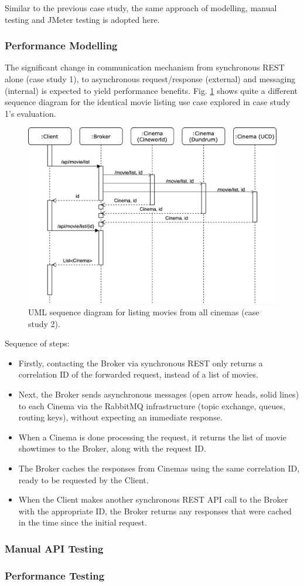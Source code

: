 Similar to the previous case study, the same approach of modelling, manual testing and JMeter testing is adopted here.

\subsubsection{Performance Modelling}

The significant change in communication mechanism from synchronous REST alone (case study 1), to asynchronous request/response (external) and messaging (internal) is expected to yield performance benefits. Fig. \ref{fig:cs02-sequence} shows quite a different sequence diagram for the identical movie listing use case explored in case study 1's evaluation.

\begin{figure}[H]
	\centering
	\includegraphics[width=0.75\linewidth]{./assets/diagrams/cs02-sequence.png}
	\caption{UML sequence diagram for listing movies from all cinemas (case study 2).}
	\label{fig:cs02-sequence}
\end{figure}

Sequence of steps:
\begin{itemize}
	\item Firstly, contacting the Broker via synchronous REST only returns a correlation ID of the forwarded request, instead of a list of movies.
	\item Next, the Broker sends asynchronous messages (open arrow heads, solid lines) to each Cinema via the RabbitMQ infrastructure (topic exchange, queues, routing keys), without expecting an immediate response.
	\item When a Cinema is done processing the request, it returns the list of movie showtimes to the Broker, along with the request ID.
	\item The Broker caches the responses from Cinemas using the same correlation ID, ready to be requested by the Client.
	\item When the Client makes another synchronous REST API call to the Broker with the appropriate ID, the Broker returns any responses that were cached in the time since the initial request.
\end{itemize}

\subsubsection{Manual API Testing}
\subsubsection{Performance Testing}
